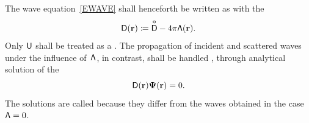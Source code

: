 The wave equation~\cref{EWAVE} shall henceforth be written as
with the 
%
%
%
\begin{equation}
  \mathsf{D}(\mathbf{r}) \coloneqq \mathsf{\overset{o}{D}} - 4\pi\mathsf{\Lambda}(\mathbf{r}).
\end{equation}
Only $\mathsf{U}$ shall be treated as a .
The propagation of incident and scattered waves under the influence of~$\mathsf{\Lambda}$,
in contrast,
shall be handled ,
through analytical solution of the 
%
%
%
\begin{equation}\label{EDPsi0}
  \mathsf{D}(\mathbf{r})\mathbf{\Psi}(\mathbf{r}) = 0.
\end{equation}
The solutions are called 
%
%
because they differ from the  waves
%
%
obtained in the  case $\mathsf{\Lambda}=0$.
%

